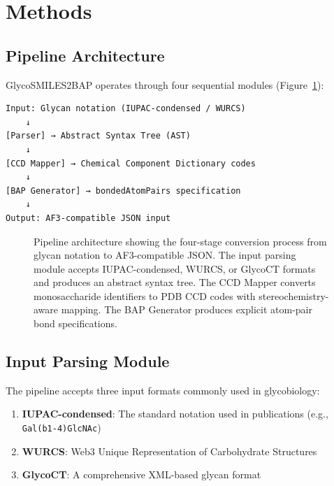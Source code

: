 \section{Methods}

\subsection{Pipeline Architecture}

GlycoSMILES2BAP operates through four sequential modules (Figure~\ref{fig:pipeline}):

\begin{verbatim}
Input: Glycan notation (IUPAC-condensed / WURCS)
    ↓
[Parser] → Abstract Syntax Tree (AST)
    ↓
[CCD Mapper] → Chemical Component Dictionary codes
    ↓
[BAP Generator] → bondedAtomPairs specification
    ↓
Output: AF3-compatible JSON input
\end{verbatim}

\begin{figure}[htbp]
\centering
\caption{Pipeline architecture showing the four-stage conversion process from glycan notation to AF3-compatible JSON. The input parsing module accepts IUPAC-condensed, WURCS, or GlycoCT formats and produces an abstract syntax tree. The CCD Mapper converts monosaccharide identifiers to PDB CCD codes with stereochemistry-aware mapping. The BAP Generator produces explicit atom-pair bond specifications.}
\label{fig:pipeline}
\end{figure}

\subsection{Input Parsing Module}

The pipeline accepts three input formats commonly used in glycobiology:

\begin{enumerate}
\item \textbf{IUPAC-condensed}: The standard notation used in publications (e.g., \texttt{Gal(b1-4)GlcNAc})
\item \textbf{WURCS}: Web3 Unique Representation of Carbohydrate Structures
\item \textbf{GlycoCT}: A comprehensive XML-based glycan format
\end{enumerate}

